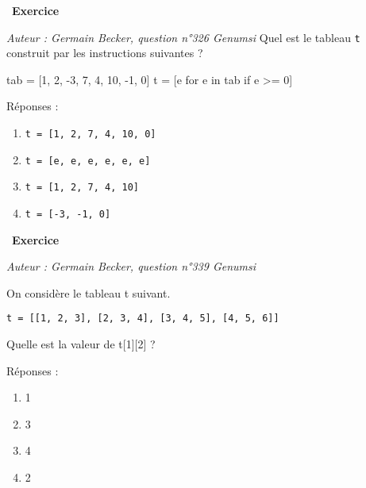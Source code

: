 \documentclass[
  11pt,
]{article}
\newcommand{\passthrough}[1]{#1}
\providecommand{\tightlist}{%
  \setlength{\itemsep}{0pt}\setlength{\parskip}{0pt}}
\newcounter{exo}
\newenvironment{exercice}[1]
{\par \medskip   \addtocounter{exo}{1} \noindent  
\begin{bclogo}[arrondi =0.1,   noborder = true, logo=\bccrayon, marge=4]{~\textbf{Exercice} \textbf{\theexo} {\itshape #1} }  \par}
{
\end{bclogo}
 \par \bigskip }
\newcounter{def}
\begin{document}
\begin{exercice}{}

\emph{Auteur : Germain Becker, question n°326 Genumsi} Quel est le
tableau \passthrough{\lstinline!t!} construit par les instructions
suivantes ?

tab = {[}1, 2, -3, 7, 4, 10, -1, 0{]} t = {[}e for e in tab if e
\textgreater= 0{]}

Réponses :

\begin{enumerate}
\def\labelenumi{\Alph{enumi})}
\tightlist
\item
  \passthrough{\lstinline!t = [1, 2, 7, 4, 10, 0]!}
\item
  \passthrough{\lstinline!t = [e, e, e, e, e, e]!}
\item
  \passthrough{\lstinline!t = [1, 2, 7, 4, 10]!}
\item
  \passthrough{\lstinline!t = [-3, -1, 0]!}
\end{enumerate}

\end{exercice}

\begin{exercice}{}

\emph{Auteur : Germain Becker, question n°339 Genumsi}

On considère le tableau t suivant.

\passthrough{\lstinline!t = [[1, 2, 3], [2, 3, 4], [3, 4, 5], [4, 5, 6]]!}

Quelle est la valeur de t{[}1{]}{[}2{]} ?

Réponses :

\begin{enumerate}
\def\labelenumi{\Alph{enumi})}
\tightlist
\item
  1
\item
  3
\item
  4
\item
  2
\end{enumerate}

\end{exercice}
\end{document}
